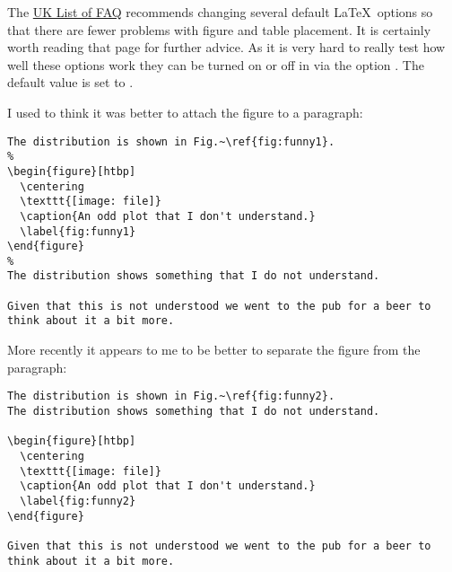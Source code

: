 The
\href{http://www.tex.ac.uk/cgi-bin/texfaq2html?label=floats}{UK List of FAQ}
recommends changing several default \LaTeX\ options so that there are fewer problems
with figure and table placement.
It is certainly worth reading that page for further advice.
As it is very hard to really test how well these options work
they can be turned on or off in  via the option .
The default value is set to .

I used to think it was better to attach the figure to a paragraph:
\begin{verbatim}
The distribution is shown in Fig.~\ref{fig:funny1}.
%
\begin{figure}[htbp]
  \centering
  \texttt{[image: file]}
  \caption{An odd plot that I don't understand.}
  \label{fig:funny1}
\end{figure}
%
The distribution shows something that I do not understand.

Given that this is not understood we went to the pub for a beer to
think about it a bit more.
\end{verbatim}

More recently it appears to me to be better to separate the figure
from the paragraph:
\begin{verbatim}
The distribution is shown in Fig.~\ref{fig:funny2}.
The distribution shows something that I do not understand.

\begin{figure}[htbp]
  \centering
  \texttt{[image: file]}
  \caption{An odd plot that I don't understand.}
  \label{fig:funny2}
\end{figure}

Given that this is not understood we went to the pub for a beer to
think about it a bit more.
\end{verbatim}


